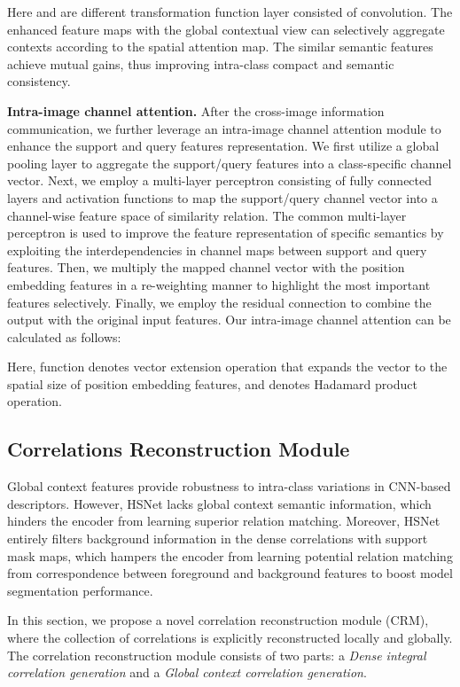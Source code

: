 \documentclass[journal]{IEEEtran}
\begin{document}
Here  and  are different transformation function layer consisted of convolution. The enhanced feature maps with the global contextual view can selectively aggregate contexts according to the spatial attention map. The similar semantic features achieve mutual gains, thus improving intra-class compact and semantic consistency.


\textbf{Intra-image channel attention.} After the cross-image information communication, we further leverage an intra-image channel attention module to enhance the support and query features representation. We first utilize a global pooling layer to aggregate the support/query features into a class-specific channel vector. Next, we employ a multi-layer perceptron consisting of fully connected layers and activation functions to map the support/query channel vector into a channel-wise feature space of similarity relation. The common multi-layer perceptron is used to improve the feature representation of specific semantics by exploiting the interdependencies in channel maps between support and query features. Then, we multiply the mapped channel vector with the position embedding features in a re-weighting manner to highlight the most important features selectively. Finally, we employ the residual connection to combine the output with the original input features. Our intra-image channel attention can be calculated as follows:



Here,  function denotes vector extension operation that expands the vector to the spatial size of position embedding features, and  denotes Hadamard product operation.


\subsection{Correlations Reconstruction Module}

Global context features provide robustness to intra-class variations in CNN-based descriptors. However, HSNet \cite{min2021hypercorrelation} lacks global context semantic information, which hinders the encoder from learning superior relation matching. Moreover, HSNet \cite{min2021hypercorrelation} entirely filters background information in the dense correlations with support mask maps, which hampers the encoder from learning potential relation matching from correspondence between foreground and background features to boost model segmentation performance.

In this section, we propose a novel correlation reconstruction module (CRM), where the collection of correlations is explicitly reconstructed locally and globally. The correlation reconstruction module consists of two parts: a \textit{Dense integral correlation generation} and a \textit{Global context correlation generation}. \par
\end{document}
